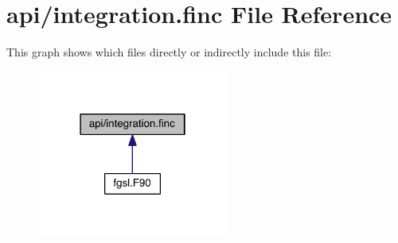 \hypertarget{integration_8finc}{\section{api/integration.finc File Reference}
\label{integration_8finc}
}
This graph shows which files directly or indirectly include this file\-:
\nopagebreak
\begin{figure}[H]
\begin{center}
\leavevmode
\includegraphics[width=178pt]{integration_8finc__dep__incl}
\end{center}
\end{figure}
